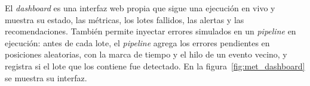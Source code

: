 El \textit{dashboard} es una interfaz web propia que sigue una ejecución en vivo y muestra su estado, las métricas, los lotes fallidos, las alertas y las recomendaciones. También permite inyectar errores simulados en un \textit{pipeline} en ejecución: antes de cada lote, el \textit{pipeline} agrega los errores pendientes en posiciones aleatorias, con la marca de tiempo y el hilo de un evento vecino, y registra si el lote que los contiene fue detectado. En la figura~\ref{fig:met_dashboard} se muestra su interfaz.


